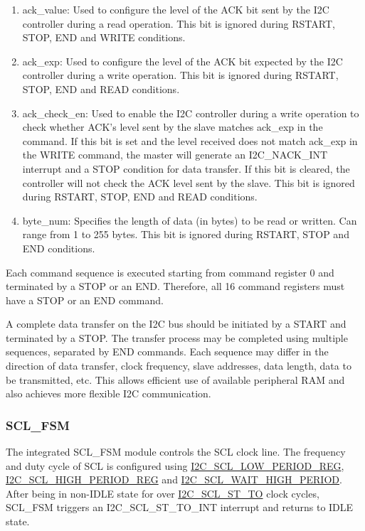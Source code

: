 \documentclass[main\_\_EN.tex]{subfiles}
\begin{document}
\begin{enumerate}
\begin{itemize}
\end{itemize}

\item ack\_value: Used to configure the level of the ACK bit sent by the I2C controller during a read operation. This bit is ignored during RSTART, STOP, END and WRITE conditions.

\item ack\_exp: Used to configure the level of the ACK bit expected by the I2C controller during a write operation. This bit is ignored during RSTART, STOP, END and READ conditions.

\item ack\_check\_en: Used to enable the I2C controller during a write operation to check whether ACK’s level sent by the slave matches ack\_exp in the command. If this bit is set and the level received does not match ack\_exp in the WRITE command, the master will generate an I2C\_NACK\_INT interrupt and a STOP condition for data transfer. If this bit is cleared, the controller will not check the ACK level sent by the slave. This bit is ignored during RSTART, STOP, END and READ conditions.

\item byte\_num: Specifies the length of data (in bytes) to be read or written. Can range from 1 to 255 bytes. This bit is ignored during RSTART, STOP and END conditions.

\end{enumerate}

Each command sequence is executed starting from command register 0 and terminated by a STOP or an END. Therefore, all 16 command registers must have a STOP or an END command.

A complete data transfer on the I2C bus should be initiated by a START and terminated by a STOP. The transfer process may be completed using multiple sequences, separated by END commands. Each sequence may differ in the direction of data transfer, clock frequency, slave addresses, data length, data to be transmitted, etc. This allows efficient use of available peripheral RAM and also achieves more flexible I2C communication.

\subsubsection{SCL\_FSM}

The integrated SCL\_FSM module controls the SCL clock line. The frequency and duty cycle of SCL is configured using \hyperref[regdesc:I2CSCLLOWPERIODREG]{I2C\_SCL\_LOW\_PERIOD\_REG}, \hyperref[regdesc:I2CSCLHIGHPERIODREG]{I2C\_SCL\_HIGH\_PERIOD\_REG} and \hyperref[fielddesc:I2CSCLWAITHIGHPERIOD]{I2C\_SCL\_WAIT\_HIGH\_PERIOD}. After being in non-IDLE state for over \hyperref[fielddesc:I2CSCLSTTO]{I2C\_SCL\_ST\_TO} clock cycles, SCL\_FSM triggers an I2C\_SCL\_ST\_TO\_INT interrupt and returns to IDLE state.
\end{document}
